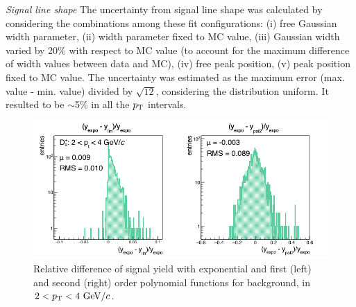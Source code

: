 \emph{Signal line shape}
The uncertainty from signal line shape was calculated by 
considering the combinations among these fit
configurations: (i) free Gaussian width parameter, (ii) width parameter 
fixed to MC value, (iii) Gaussian width varied by 20\% with 
respect to MC value (to account for the maximum difference of width values between data and MC), 
(iv) free peak position, (v) peak position fixed to MC value.
The uncertainty was estimated as the maximum error (max. value - min. value) divided by $\sqrt{12}$,
considering the distribution uniform.
It resulted to be $\sim$5\% in all the $p_{\rm T}$ intervals. 

\begin{figure}[!hb]
\begin{center}
 \includegraphics[width=.70\textwidth]{FigCap4/studyBkg_Free_pt0.png}
\caption{Relative difference of signal yield with exponential and first (left) and second (right) 
order polynomial functions for background, in $2 < p_{\rm T} < 4 ~\mathrm{GeV}/c$.}             
\label{fig:diffBkgPt0}
\end{center}
\end{figure}



